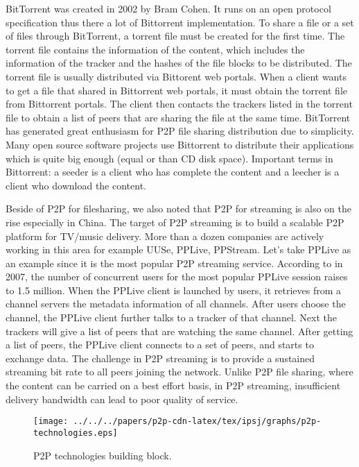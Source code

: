 BitTorrent was created in 2002 by Bram Cohen. 
It runs on an open protocol specification thus there a lot of Bittorrent implementation.
To share a file or a set of files through BitTorrent, a torrent file must be created for the first time.  
The torrent file contains the information of the content, which includes the information of the tracker and the hashes of the file blocks to be distributed.
The torrent file is usually distributed via Bittorent web portals.
When a client wants to get a file that shared in Bittorrent web portals, it must obtain the torrent file from Bittorrent portals.
The client then contacts the trackers listed in the torrent file to obtain a list of peers that are sharing the file at the same time.  
BitTorrent has generated great enthusiasm for P2P file sharing distribution due to simplicity.  
Many open source software projects use Bittorrent to distribute their applications which is quite big enough (equal or than CD disk space).
Important terms in Bittorrent: a seeder is a client who has complete the content and a leecher is a client who download the content.

Beside of P2P for filesharing, we also noted that P2P for streaming is also on the rise especially in China.
The target of P2P streaming is to build a scalable P2P platform for TV/music delivery. 
More than a dozen companies are actively working in this area for example UUSe, PPLive, PPStream.  
Let's take PPLive as an example since it is the most popular P2P streaming service.
According to \cite{} in 2007, the number of concurrent users for the most popular PPLive session raises to 1.5 million.
When the PPLive client is launched by users, it retrieves from a channel servers the metadata information of all channels. 
After users choose the channel, the PPLive client further talks to a tracker of that channel. 
Next the trackers will give  a list of peers that are watching the same channel. 
After getting a list of peers, the PPLive client connects to a set of peers, and starts to exchange data. 
The challenge in P2P streaming is to provide a sustained streaming bit rate to all peers joining the network. 
Unlike P2P file sharing, where the content can be carried on a best effort basis, in P2P streaming, insufficient delivery bandwidth can lead to poor quality of service. 

\begin{figure}[tb]
\begin{center}
\texttt{[image: ../../../papers/p2p-cdn-latex/tex/ipsj/graphs/p2p-technologies.eps]}
\end{center}
\caption{P2P technologies building block.} 
\label{fig:p2ptech}
\end{figure}

